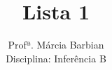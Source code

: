 \documentclass[10pt,brazil,addpoints]{exam}
\begin{document}
\title{Lista 1}


\author{
  Profª. Márcia Barbian \\
  Disciplina: Inferência B\\
  \date{}
}


\maketitle
\end{document}
